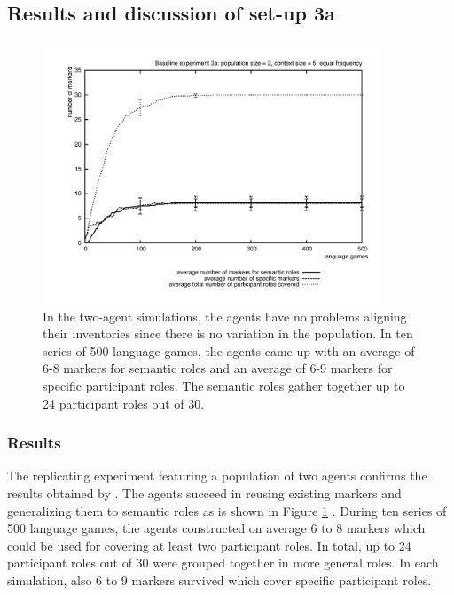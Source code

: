 \subsection{Results and discussion of set-up 3a}

\begin{figure}[ht]
\centerline{\includegraphics[width=0.9\textwidth]{Chapter3/figs/graph-base3-size3a}}
  \caption[Baseline experiment 3a: number of markers]{In the two-agent simulations, the agents have no problems aligning their inventories since there is no variation in the population. In ten series of 500 language games, the agents came up with an average of 6-8 markers for semantic roles and an average of 6-9 markers for specific participant roles. The semantic roles gather together up to 24 participant roles out of 30.}
   \label{f:base3-size3a}
\end{figure}

\subsubsection{Results}
 The replicating experiment featuring a population of two agents confirms the results obtained by \citet{steels02simulating, steels04constructivist}. The agents succeed in reusing existing markers and generalizing them to semantic roles as is shown in Figure \ref{f:base3-size3a} . During ten series of 500 language games, the agents constructed on average 6 to 8 markers which could be used for covering at least two participant roles. In total, up to 24 participant roles out of 30 were grouped together in more general roles. In each simulation, also 6 to 9 markers survived which cover specific participant roles.

